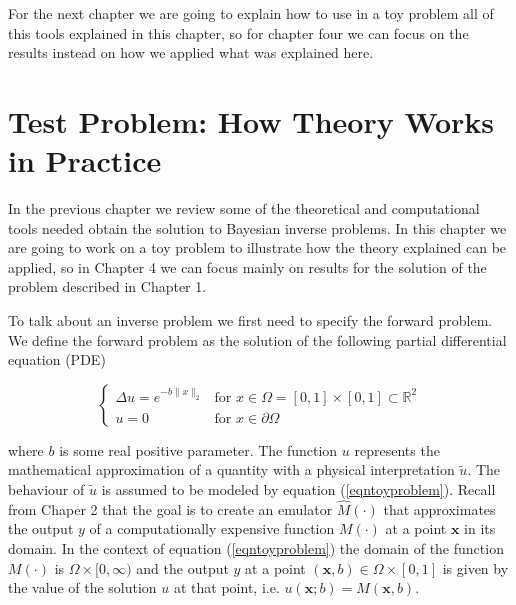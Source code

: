 \documentclass[12pt]{book}
\begin{document}
 

For the next chapter we are going to explain how to use in a toy problem all of this tools explained in this 
chapter, so for chapter four we can focus on the results instead on how we applied what was explained here. 



\chapter{Test Problem: How Theory Works in Practice}

In the previous chapter we review some  of the theoretical and computational tools needed obtain
the solution to Bayesian inverse problems. In this chapter
we are going to work on a toy problem to illustrate how the theory explained can be applied, so
in Chapter 4 we can focus mainly on  results for the  solution of the problem described in Chapter 1.


To talk about an inverse problem  we first need to specify  the forward problem. 
We define the forward problem as the solution of the  following
partial differential equation (PDE)

\begin{equation}\label{eqntoyproblem}
\left\{
	\begin{array}{ll}
		\Delta u=e^{-b\|x\|_{2}} &\mbox{for } x\in\Omega=[0,1]\times [0,1]\subset\mathbb{R}^{2} \\
		u=0 & \mbox{for } x\in\partial\Omega
	\end{array}
\right.
\end{equation} 

where $b$ is some real positive parameter. The 
function $u$ represents the mathematical approximation of  a quantity with a physical interpretation  $\tilde{u}$. The  behaviour
of $\tilde{u}$ is assumed to be    modeled by equation (\ref{eqntoyproblem}).
Recall from Chaper 2 that the goal is to create an emulator $\hat{M}(\cdot)$  that approximates
the output $y$  of a computationally expensive function  $M(\cdot)$ at a point $\textbf{x}$ in its domain. 
In the context of equation (\ref{eqntoyproblem}) the domain of the function $M(\cdot)$ is $\Omega\times[0,\infty)$
and the output $y$ at a point $(\textbf{x},b)\in\Omega\times [0,1]$ is given by the value of the solution $u$ at that 
point, i.e. $u(\textbf{x};b)=M(\textbf{x},b)$. 
\end{document}
